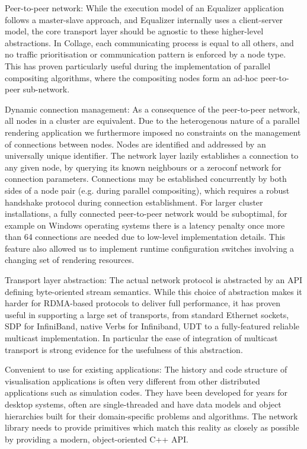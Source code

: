 \begin{compactdesc}

\item[Peer-to-peer network:] While the execution model of an Equalizer
application follows a master-slave approach, and Equalizer internally uses a
client-server model, the core transport layer should be agnostic to these
higher-level abstractions. In Collage, each communicating process is equal to
all others, and no traffic prioritisation or communication pattern is enforced
by a node type. This has proven particularly useful during the implementation of
parallel compositing algorithms, where the compositing nodes form an ad-hoc
peer-to-peer sub-network.

\item[Dynamic connection management:] As a consequence of the peer-to-peer
network, all nodes in a cluster are equivalent. Due to the heterogenous nature
of a parallel rendering application we furthermore imposed no constraints on
the management of connections between nodes. Nodes are identified and addressed
by an universally unique identifier. The network layer lazily establishes a
connection to any given node, by querying its known neighbours or a zeroconf
network for connection parameters. Connections may be established concurrently
by both sides of a node pair (e.g. during parallel compositing), which requires
a robust handshake protocol during connection establishment. For larger cluster
installations, a fully connected peer-to-peer network would be suboptimal, for
example on Windows operating systems there is a latency penalty once more than
64 connections are needed due to low-level implementation details. This feature
also allowed us to implement runtime configuration switches involving a
changing set of rendering resources.

\item[Transport layer abstraction:] The actual network protocol is abstracted
by an API defining byte-oriented stream semantics. While this choice of
abstraction makes it harder for RDMA-based protocols to deliver full
performance, it has proven useful in supporting a large set of transports, from
standard Ethernet sockets, SDP for InfiniBand, native Verbs for Infiniband, UDT
to a fully-featured reliable multicast implementation. In particular the ease
of integration of multicast transport is strong evidence for the usefulness of
this abstraction.

\item[Convenient to use for existing applications:] The history and code
structure of visualisation applications is often very different from other
distributed applications such as simulation codes. They have been developed for
years for desktop systems, often are single-threaded and have data models and
object hierarchies built for their domain-specific problems and algorithms. The
network library needs to provide primitives which match this reality as closely
as possible by providing a modern, object-oriented C++ API.

\end{compactdesc}


